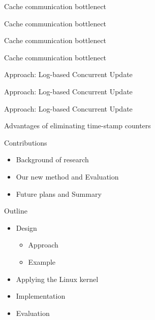 \documentclass[english]{beamer} %
\begin{document}
\begin{frame}{Cache communication bottlenect}
\end{frame}


\begin{frame}{Cache communication bottlenect}
\end{frame}


\begin{frame}{Cache communication bottlenect}
\end{frame}

\begin{frame}{Cache communication bottlenect}
\end{frame}



\begin{frame}{Approach: Log-based Concurrent Update}
\end{frame}


\begin{frame}{Approach: Log-based Concurrent Update}
\end{frame}


\begin{frame}{Approach: Log-based Concurrent Update}
\end{frame}


\begin{frame}{Advantages of eliminating time-stamp counters}
\end{frame}


\begin{frame}{Contributions}
	\begin{itemize}
	\item Background of research 
	\item Our new method and Evaluation
	\item Future plans and Summary
	\end{itemize}
\end{frame}


\begin{frame}{Outline}
	\begin{itemize}
	\item Design
	\begin{itemize}
	\item Approach
	\item Example 
	\end{itemize}
	\item Applying the Linux kernel
	\item Implementation
	\item Evaluation
	\end{itemize}
\end{frame}
\end{document}
